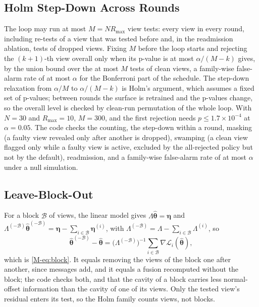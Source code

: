 \subsection{Holm Step-Down Across Rounds}
The loop may run at most $M=NR_{\max}$ view tests: every view in every round, including re-tests of a
view that was tested before and, in the readmission ablation, tests of dropped views. Fixing $M$ before
the loop starts and rejecting the $(k{+}1)$-th view overall only when its p-value is at most
$\alpha/(M-k)$ gives, by the union bound over the at most $M$ tests of clean views, a family-wise
false-alarm rate of at most $\alpha$ for the Bonferroni part of the schedule. The step-down relaxation
from $\alpha/M$ to $\alpha/(M-k)$ is Holm's argument, which assumes a fixed set of p-values; between rounds
the surface is retrained and the p-values change, so the overall level is checked by clean-run
permutation of the whole loop. With $N=30$ and $R_{\max}=10$, $M=300$, and the first rejection needs
$p\le1.7\times10^{-4}$ at $\alpha=0.05$. The code checks the counting, the step-down within a round,
masking (a faulty view revealed only after another is dropped), swamping (a clean view flagged only while a
faulty view is active, excluded by the all-rejected policy but not by the default), readmission, and a
family-wise false-alarm rate of at most $\alpha$ under a null simulation.

\subsection{Leave-Block-Out}
For a block $\mathcal{B}$ of views, the linear model gives $\Lambda\hat{\boldsymbol\theta}=\boldsymbol\eta$ and
$\Lambda^{(-\mathcal{B})}\hat{\boldsymbol\theta}^{(-\mathcal{B})}=\boldsymbol\eta-\sum_{i\in\mathcal{B}}\boldsymbol\eta^{(i)}$, with
$\Lambda^{(-\mathcal{B})}=\Lambda-\sum_{i\in\mathcal{B}}\Lambda^{(i)}$, so
\[
\hat{\boldsymbol\theta}^{(-\mathcal{B})}-\hat{\boldsymbol\theta}=\bigl(\Lambda^{(-\mathcal{B})}\bigr)^{-1}\sum_{i\in\mathcal{B}}\nabla\mathcal{L}_i(\hat{\boldsymbol\theta}),
\]
which is \eqref{M-eq:block}. It equals removing the views of the block one after another, since messages add,
and it equals a fusion recomputed without the block; the code checks both, and that the cavity of a block
carries less normal-offset information than the cavity of one of its views. Only the tested view's
residual enters its test, so the Holm family counts views, not blocks.

